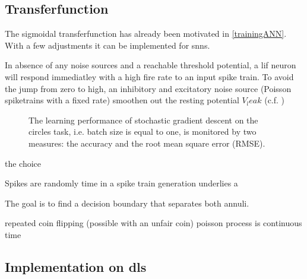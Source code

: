 \subsection{Transferfunction}

The sigmoidal transferfunction has already been motivated in \cref{trainingANN}. With a few adjustments it can be implemented for \glspl{snn}.

In absence of any noise sources and a reachable threshold potential, a \gls{lif} neuron will respond immediatley with a high fire rate to an input spike train. To avoid the jump from zero to high, an inhibitory and excitatory noise source (Poisson spiketrains with a fixed rate) smoothen out the resting potential $V_leak$ (c.f. )


\begin{figure}
	\label{vleak_w_noise}
	\begin{center}
		
	\end{center}
	\caption{The learning performance of stochastic gradient descent on the circles task, i.e. batch size is equal to one, is monitored by two measures: the accuracy and the root mean square error (RMSE).}
\end{figure}


 the choice




Spikes are randomly time in a spike train generation underlies a 




%
%


The goal is to find a decision boundary that separates both annuli. 

repeated coin flipping (possible with an unfair coin) poisson process is continuous time 

\subsection{Implementation on \gls{dls}}






